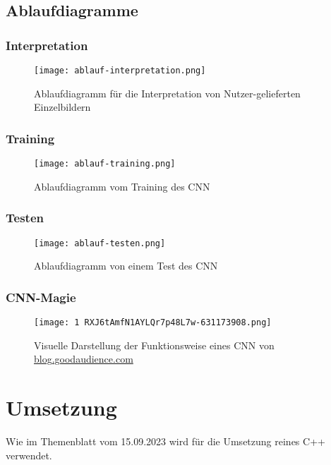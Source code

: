 \subsection{Ablaufdiagramme}
\label{sec:AnalyseAblaufdiagramme}

\subsubsection{Interpretation}
\label{sec:AnalyseInterpretation}
\begin{figure}[H]
	\centering
	\texttt{[image: ablauf-interpretation.png]}
	\caption{Ablaufdiagramm für die Interpretation von Nutzer-gelieferten Einzelbildern}
	\label{fig:analyseablauf-interpretation}
\end{figure}


\subsubsection{Training}
\label{sec:AnalyseTraining}
\begin{figure}[H]
	\centering
	\texttt{[image: ablauf-training.png]}
	\caption{Ablaufdiagramm vom Training des CNN}
	\label{fig:analyseablauf-training}
\end{figure}


\subsubsection{Testen}
\label{sec:AnalyseTesten}
\begin{figure}[H]
	\centering
	\texttt{[image: ablauf-testen.png]}
	\caption{Ablaufdiagramm von einem Test des CNN}
	\label{fig:analyseablauf-testen}
\end{figure}


\subsubsection{CNN-Magie}
\label{sec:AnalyseCNN-Magic}
\begin{figure}[H]
	\centering
	\texttt{[image: 1 RXJ6tAmfN1AYLQr7p48L7w-631173908.png]}
	\caption{Visuelle Darstellung der Funktionsweise eines CNN von \href{https://blog.goodaudience.com/cnn-for-rnns-a-gentle-approach-to-use-cnns-for-nlp-53ab80768d43}{blog.goodaudience.com}}
	\label{fig:analyse1RXJ6tAmfN1AYLQr7p48L7w-631173908}
\end{figure}

\section{Umsetzung}
\label{sec:AnalyseUmsetzung}
Wie im Themenblatt vom 15.09.2023 wird für die Umsetzung reines C++ verwendet.

